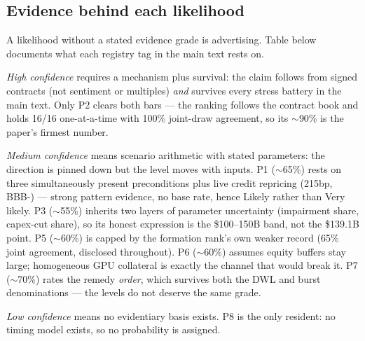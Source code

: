 \documentclass[11pt,a4paper]{article}
\begin{document}
\subsection{Evidence behind each likelihood}\label{sec:confidence}
A likelihood without a stated evidence grade is advertising. Table
below documents what each registry tag in the main text
rests on.

\emph{High confidence} requires a mechanism plus survival: the claim follows
from signed contracts (not sentiment or multiples) \emph{and} survives every
stress battery in the main text. Only P2 clears both bars ---
the ranking follows the contract book and holds 16/16 one-at-a-time with
100\% joint-draw agreement, so its $\sim$90\% is the paper's firmest number.

\emph{Medium confidence} means scenario arithmetic with stated parameters:
the direction is pinned down but the level moves with inputs. P1
($\sim$65\%) rests on three simultaneously present preconditions plus live
credit repricing (215bp, BBB-) --- strong pattern evidence, no base rate,
hence Likely rather than Very likely. P3 ($\sim$55\%) inherits two layers of
parameter uncertainty (impairment share, capex-cut share), so its honest
expression is the \$100--150B band, not the \$139.1B point. P5
($\sim$60\%) is capped by the formation rank's own weaker record (65\%
joint agreement, disclosed throughout). P6 ($\sim$60\%) assumes equity
buffers stay large; homogeneous GPU collateral is exactly the channel that
would break it. P7 ($\sim$70\%) rates the remedy \emph{order}, which survives
both the DWL and burst denominations --- the levels do not deserve the same
grade.

\emph{Low confidence} means no evidentiary basis exists. P8 is the only
resident: no timing model exists, so no probability is assigned.
\end{document}
